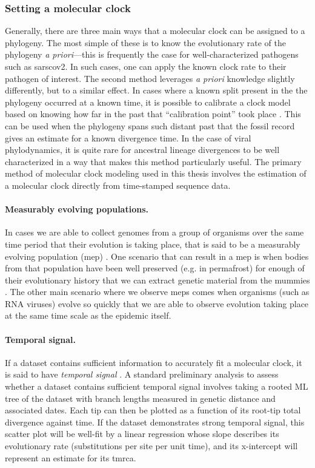 \subsubsection{Setting a molecular clock}
Generally, there are three main ways that a molecular clock can be assigned to a phylogeny.
The most simple of these is to know the evolutionary rate of the phylogeny \textit{a priori}---this is frequently the case for well-characterized pathogens such as \gls{sarscov2}.
In such cases, one can apply the known clock rate to their pathogen of interest.
The second method leverages \textit{a priori} knowledge slightly differently, but to a similar effect.
In cases where a known split present in the the phylogeny occurred at a known time, it is possible to calibrate a clock model based on knowing how far in the past that ``calibration point'' took place \citep{ho2009accounting}.
This can be used when the phylogeny spans such distant past that the fossil record gives an estimate for a known divergence time.
In the case of viral phylodynamics, it is quite rare for ancestral lineage divergences to be well characterized in a way that makes this method particularly useful.
The primary method of molecular clock modeling used in this thesis involves the estimation of a molecular clock directly from time-stamped sequence data.

\paragraph*{Measurably evolving populations.}
In cases we are able to collect genomes from a group of organisms over the same time period that their evolution is taking place, that is said to be a measurably evolving population (\gls{mep}) \citep{drummond2003measurably}.
One scenario that can result in a \gls{mep} is when bodies from that population have been well preserved (e.g. in permafrost) for enough of their evolutionary history that we can extract genetic material from the mummies \citep{shapiro2004rise}.
The other main scenario where we observe \gls{mep}s comes when organisms (such as RNA viruses) evolve so quickly that we are able to observe evolution taking place at the same time scale as the epidemic itself.

\paragraph*{Temporal signal.}
If a dataset contains sufficient information to accurately fit a molecular clock, it is said to have \textit{temporal signal} \citep{duchene2020bayesian}.
A standard preliminary analysis to assess whether a dataset contains sufficient temporal signal involves taking a rooted ML tree of the dataset with branch lengths measured in genetic distance and associated dates.
Each tip can then be plotted as a function of its root-tip total divergence against time.
If the dataset demonstrates strong temporal signal, this scatter plot will be well-fit by a linear regression whose slope describes its evolutionary rate (substitutions per site per unit time), and its x-intercept will represent an estimate for its \gls{tmrca}.

